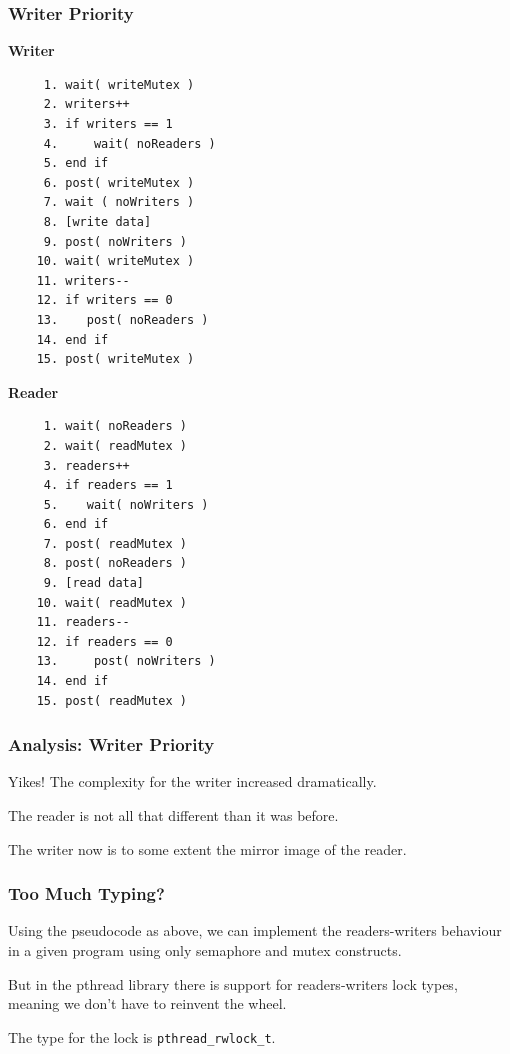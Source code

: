 \begin{frame}[fragile]
	\frametitle{Writer Priority}

	\begin{multicols}{2}
		\textbf{Writer}\vspace{-1em}
		\begin{verbatim}
     1. wait( writeMutex )
     2. writers++
     3. if writers == 1
     4.     wait( noReaders )
     5. end if
     6. post( writeMutex )
     7. wait ( noWriters )
     8. [write data]
     9. post( noWriters ) 
    10. wait( writeMutex )
    11. writers--
    12. if writers == 0
    13.    post( noReaders )
    14. end if
    15. post( writeMutex )     
  \end{verbatim}
		\columnbreak
		\textbf{Reader}\vspace{-2em}
		\begin{verbatim}
     1. wait( noReaders )
     2. wait( readMutex )
     3. readers++
     4. if readers == 1
     5.    wait( noWriters )
     6. end if
     7. post( readMutex )
     8. post( noReaders )
     9. [read data]
    10. wait( readMutex )
    11. readers--
    12. if readers == 0
    13.     post( noWriters )
    14. end if
    15. post( readMutex )
\end{verbatim}
	\end{multicols}
	\vspace{-2em}

\end{frame}


\begin{frame}
	\frametitle{Analysis: Writer Priority}

	Yikes! The complexity for the writer increased dramatically.

	The reader is not all that different than it was before.

	The writer now is to some extent the mirror image of the reader.

\end{frame}


\begin{frame}
	\frametitle{Too Much Typing?}

	Using the pseudocode as above, we can implement the readers-writers behaviour in a given program using only semaphore and mutex constructs.

	But in the pthread library there is support for readers-writers lock types, meaning we don't have to reinvent the wheel.

	The type for the lock is \texttt{pthread\_rwlock\_t}.

\end{frame}


